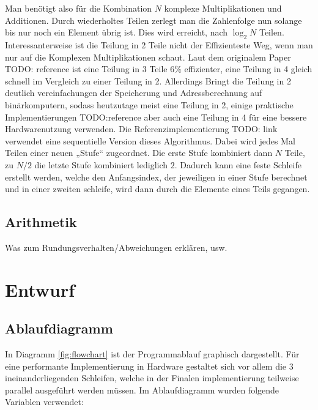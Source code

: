 \documentclass[fontsize=12pt,paper=a4,ngerman]{scrarticle}
\begin{document}
Man benötigt also für die Kombination $N$ komplexe Multiplikationen und
Additionen. Durch wiederholtes Teilen zerlegt man die Zahlenfolge nun solange
bis nur noch ein Element übrig ist. Dies wird erreicht, nach $\log_2N$ Teilen.
Interessanterweise ist die Teilung in 2 Teile nicht der Effizienteste Weg, wenn
man nur auf die Komplexen Multiplikationen schaut. Laut dem originalem Paper
TODO: reference ist eine Teilung in 3 Teile $6\%$ effizienter, eine Teilung in
4 gleich schnell im Vergleich zu einer Teilung in 2. Allerdings Bringt die
Teilung in 2 deutlich vereinfachungen der Speicherung und Adressberechnung auf
binärkomputern, sodass heutzutage meist eine Teilung in 2, einige praktische
Implementierungen TODO:reference aber auch eine Teilung in 4 für eine bessere
Hardwarenutzung verwenden. Die Referenzimplementierung TODO: link verwendet
eine sequentielle Version dieses Algorithmus. Dabei wird jedes Mal Teilen einer
neuen „Stufe“ zugeordnet. Die erste Stufe kombiniert dann $N$ Teile, zu $N/2$
die letzte Stufe kombiniert lediglich $2$. Dadurch kann eine feste Schleife
erstellt werden, welche den Anfangsindex, der jeweiligen in einer Stufe
berechnet und in einer zweiten schleife, wird dann durch die Elemente eines
Teils gegangen.
\subsection{Arithmetik}
Was zum Rundungsverhalten/Abweichungen erklären, usw.

\section{Entwurf}
\subsection{Ablaufdiagramm}
In Diagramm \ref{fig:flowchart} ist der Programmablauf graphisch dargestellt.
Für eine performante Implementierung in Hardware gestaltet sich vor allem die 3
ineinanderliegenden Schleifen, welche in der Finalen implementierung teilweise
parallel ausgeführt werden müssen. Im Ablaufdiagramm wurden folgende Variablen
verwendet:
\end{document}
